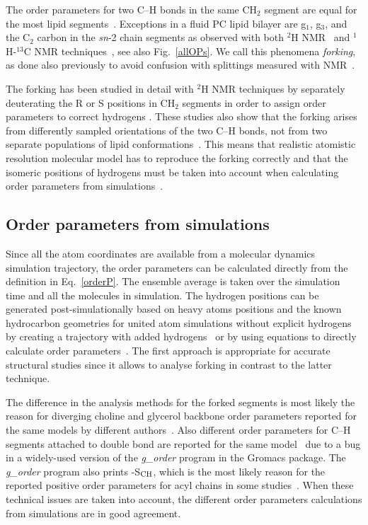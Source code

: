 \documentclass[aps,prl,superscriptaddress,twocolumn]{revtex4}
\begin{document}
The order parameters for two C--H bonds in the same CH$_2$ segment are equal for the most lipid 
segments~\cite{seelig74,seelig77,seelig78,gally81,gross97,dvinskikh05a,ferreira13}.
Exceptions in a fluid PC lipid bilayer are g$_1$, g$_3$, and  the C$_2$ carbon in the \textit{sn}-2 chain 
segments as observed with both $^2$H NMR~\cite{seelig75,seelig78,engel81,gally81} and 
$^1$H-$^{13}$C NMR techniques~\cite{gross97,dvinskikh05a,ferreira13}, see also Fig.~\ref{allOPs}.
We call this phenomena {\it forking}, as done also previously to avoid confusion with splittings measured with NMR~\cite{botan15}.

The forking has been studied in detail with $^2$H NMR techniques by separately deuterating the 
R or S positions in CH$_2$ segments in order to assign order parameters to correct hydrogens \cite{gally81,engel81}.
These studies also show that the forking arises from differently sampled orientations 
of the two C--H bonds, not from two separate populations of lipid conformations~\cite{engel81,gally81}.
This means that realistic atomistic resolution molecular model has to reproduce the forking 
correctly and that the isomeric positions of hydrogens must be taken into account when calculating
order parameters from simulations~\cite{botan15}.



\subsection{Order parameters from simulations}

Since all the atom coordinates are available from a molecular dynamics simulation trajectory,
the order parameters can be calculated directly from the definition in Eq.~\ref{orderP}.
The ensemble average is taken over the simulation time and all the molecules in simulation.
The hydrogen positions can be generated post-simulationally based on heavy atoms positions and the 
known hydrocarbon geometries for united atom simulations without explicit hydrogens 
by creating a trajectory with added hydrogens~\cite{ollila07a,botan15} or by using equations to directly calculate 
order parameters~\cite{tieleman97,vermeer07}. The first approach is appropriate for accurate 
structural studies since it allows to analyse forking in contrast to the latter technique.

The difference in the analysis methods for the forked segments is most likely the reason for 
diverging choline and glycerol backbone order parameters reported for the same models by different 
authors~\cite{poger12,botan15}. Also different order parameters for C--H segments attached to double 
bond are reported for the same model~\cite{bachar04,ollila07a} due to a bug in a widely-used version of 
the {\it g\_order} program in the Gromacs package. The {\it g\_order} program also prints -S$_{{\rm CH}}$, 
which is the most likely reason for the reported positive order parameters for acyl chains in some studies~\cite{ekkabut07}.
When these technical issues are taken into account, the different order parameters calculations from simulations are 
in good agreement.
\end{document}
